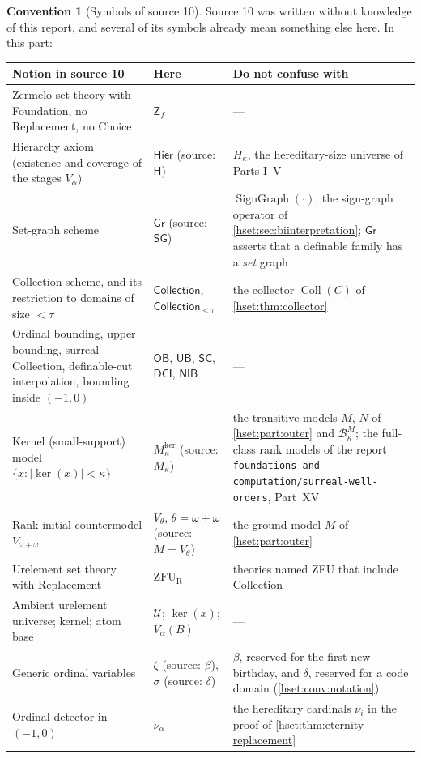 \documentclass[11pt,letterpaper]{article}
\theoremstyle{definition}
\newtheorem{convention}[convention]{Convention}\aliascntresetthe{convention}
\theoremstyle{remark}
\newcommand{\B}{\mathcal B}
\newcommand{\Coll}{\operatorname{Coll}}
\newcommand{\SG}{\operatorname{SignGraph}}
\newcommand{\card}[1]{\lvert#1\rvert}
\newcommand{\repo}[1]{\nolinkurl{#1}}
\newcommand{\Zf}{\mathsf{Z}_{\!f}}
\newcommand{\Hier}{\mathsf{Hier}}
\newcommand{\ZFUR}{\mathrm{ZFU}_{\mathrm R}}
\newcommand{\OB}{\mathsf{OB}}
\newcommand{\Gr}{\mathsf{Gr}}
\newcommand{\UB}{\mathsf{UB}}
\newcommand{\SC}{\mathsf{SC}}
\newcommand{\DCI}{\mathsf{DCI}}
\newcommand{\NIB}{\mathsf{NIB}}
\newcommand{\CollS}{\mathsf{Collection}}
\newcommand{\kerat}{\operatorname{ker}}
\newcommand{\Mker}{M^{\mathrm{ker}}}
\newcommand{\Uk}{\mathcal U}
\begin{document}
\begin{convention}[Symbols of source 10]\label{hset:zr:conv:notation}
Source 10 was written without knowledge of this report, and several of its
symbols already mean something else here. In this part:
\begin{center}\small
\begin{longtable}{@{}P{0.25\textwidth}P{0.22\textwidth}P{0.45\textwidth}@{}}
\toprule
Notion in source 10 & Here & Do not confuse with\\
\midrule\endhead
Zermelo set theory with Foundation, no Replacement, no Choice & $\Zf$ & ---\\
Hierarchy axiom (existence and coverage of the stages $V_\alpha$) & $\Hier$ (source: $\mathsf H$) & $H_\kappa$, the hereditary-size universe of Parts I--V\\
Set-graph scheme & $\Gr$ (source: $\mathsf{SG}$) & $\SG(\cdot)$, the sign-graph operator of \cref{hset:sec:biinterpretation}; $\Gr$ asserts that a definable family has a \emph{set} graph\\
Collection scheme, and its restriction to domains of size $<\tau$ & $\CollS$, $\CollS_{<\tau}$ & the collector $\Coll(C)$ of \cref{hset:thm:collector}\\
Ordinal bounding, upper bounding, surreal Collection, definable-cut interpolation, bounding inside $(-1,0)$ & $\OB$, $\UB$, $\SC$, $\DCI$, $\NIB$ & ---\\
Kernel (small-support) model $\{x:\card{\kerat(x)}<\kappa\}$ & $\Mker_\kappa$ (source: $M_\kappa$) & the transitive models $M$, $N$ of \cref{hset:part:outer} and $\B^M_\kappa$; the full-class rank models of the report \repo{foundations-and-computation/surreal-well-orders}, Part~XV\\
Rank-initial countermodel $V_{\omega+\omega}$ & $V_\theta$, $\theta=\omega+\omega$ (source: $M=V_\theta$) & the ground model $M$ of \cref{hset:part:outer}\\
Urelement set theory with Replacement & $\ZFUR$ & theories named ZFU that include Collection\\
Ambient urelement universe; kernel; atom base & $\Uk$; $\kerat(x)$; $V_\alpha(B)$ & ---\\
Generic ordinal variables & $\zeta$ (source: $\beta$), $\sigma$ (source: $\delta$) & $\beta$, reserved for the first new birthday, and $\delta$, reserved for a code domain (\cref{hset:conv:notation})\\
Ordinal detector in $(-1,0)$ & $\nu_\alpha$ & the hereditary cardinals $\nu_i$ in the proof of \cref{hset:thm:eternity-replacement}\\

\end{longtable}
\end{center}
\end{convention}
\end{document}
